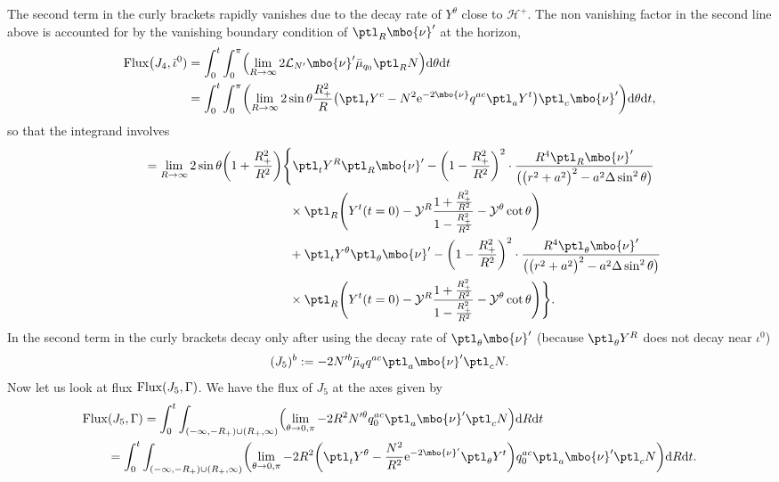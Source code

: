 The second term in the curly brackets rapidly vanishes due to the decay rate of $Y^ \theta$ close to $\mathcal{H}^+$. The non vanishing factor in the second line above is accounted for by the vanishing boundary condition of $\ptl_R \mbo{\nu}'$ at the horizon,
\begin{align*}
{\rm Flux} \bigl(J_4, \bar{\iota}^0) &{}= \int^t_0 \int^\pi _0 \Bigl(\lim_{R \to \infty} 2 \mathcal{L}_{N'} \mbo{\nu}' \bar{\mu}_{q_0} \ptl_R N \Bigr) {\rm d}\theta {\rm d}t \notag \\
&{}= \int^t_0 \int^\pi _0 \biggl( \lim_{R \to \infty} 2 \sin \theta \frac{R^2_+}{R} \bigl(\ptl_t Y^c - N^2 {\rm e}^{-2 \mbo{\nu}} q^{ac} \ptl_a Y^t\bigr) \ptl_c \mbo{\nu}' \biggr) {\rm d} \theta {\rm d}t,
\end{align*}
so that the integrand involves
\begin{align*}
\qquad{} &{}= \lim_{R \to \infty} 2 \sin \theta \biggl(1+ \frac{R^2_+}{R^2} \biggr) \Biggl\{ \ptl_t Y^R \ptl_R \mbo{\nu}' - \biggl(1- \frac{R^2_+}{R^2} \biggr)^2 \cdot \frac{R^4 \ptl_R \mbo{\nu}'}{ \bigl(\bigl(r^2+a^2\bigr)^2 -a^2 \Delta
 	\sin^2 \theta \bigr)} \notag\\
 & \hphantom{= \lim_{R \to \infty} 2 \sin \theta \biggl(1+ \frac{R^2_+}{R^2} \biggr) \Biggl\{}{}
 \times \ptl_R \Biggl(Y^t (t=0) - \mathcal{Y}^R \frac{1 + \frac{R^2_+}{R^2}} {{1-\frac{R^2_+}{R^2}} } - \mathcal{Y}^ \theta \cot \theta \Biggr) \notag\\
 & \hphantom{= \lim_{R \to \infty} 2 \sin \theta \biggl(1+ \frac{R^2_+}{R^2} \biggr) \Biggl\{}{}
 + \ptl_t Y^ \theta \ptl_\theta \mbo{\nu}' - \biggl(1 - \frac{R^2_+}{R^2} \biggr)^2 \cdot \frac{R^4 \ptl_\theta \mbo{\nu}'}{ \bigl(\bigl(r^2+a^2\bigr)^2 -a^2 \Delta \sin^2 \theta\bigr)} \notag\\
 & \hphantom{= \lim_{R \to \infty} 2 \sin \theta \biggl(1+ \frac{R^2_+}{R^2} \biggr) \Biggl\{}{}
 \times \ptl_R \Biggl(Y^t(t=0) - \mathcal{Y}^R \frac{1+ \frac{R^2_+}{R^2}}{1-\frac{R^2_+}{R^2}} - \mathcal{Y}^\theta \cot \theta \Biggr) \Biggr\}.
\end{align*}
In the second term in the curly brackets decay only after using the decay rate of $\ptl_ \theta \mbo{\nu}'$ \big(because $ \ptl_\theta Y^R$ does not decay near $\iota^0$\big)
\begin{align*}
(J_5)^b := -2N'^b \bar{\mu}_q q^{ac} \ptl_a \mbo{\nu}' \ptl_c N.
\end{align*}
Now let us look at flux
${\rm Flux} (J_5, \Gamma)$.
We have the flux of $J_5$ at the axes given by
\begin{align*}
&{\rm Flux} (J_5, \Gamma)= \int^t_0 \int_{(-\infty, -R_+) \cup (R_+, \infty)} \Bigl(\lim_{\theta \to 0, \pi}-2 R^2 N'^ \theta q^{ac}_0 \ptl_a \mbo{\nu}' \ptl_c N\Bigr) {\rm d}R {\rm d}t \\
&\qquad{}= \int^t_0 \int_{(-\infty, -R_+) \cup (R_+, \infty)} \biggl(\lim_{\theta \to 0, \pi} -2 R^2 \biggl(\ptl_ t Y^\theta - \frac{N^2}{R^2} {\rm e}^{-2 \mbo{\nu}'} \ptl_\theta Y^t \biggr) q^{ac}_0 \ptl_a \mbo{\nu}' \ptl_c N\biggr) {\rm d}R {\rm d}t.
\end{align*}
